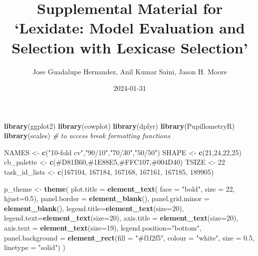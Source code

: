 \documentclass[
]{book}
\title{Supplemental Material for `Lexidate: Model Evaluation and Selection with Lexicase Selection'}
\author{Jose Guadalupe Hernandez, Anil Kumar Saini, Jason H. Moore}
\date{2024-01-31}
\newenvironment{Shaded}{\begin{snugshade}}{\end{snugshade}}
\newcommand{\AttributeTok}[1]{\textcolor[rgb]{0.13,0.29,0.53}{#1}}
\newcommand{\CommentTok}[1]{\textcolor[rgb]{0.56,0.35,0.01}{\textit{#1}}}
\newcommand{\DecValTok}[1]{\textcolor[rgb]{0.00,0.00,0.81}{#1}}
\newcommand{\FloatTok}[1]{\textcolor[rgb]{0.00,0.00,0.81}{#1}}
\newcommand{\FunctionTok}[1]{\textcolor[rgb]{0.13,0.29,0.53}{\textbf{#1}}}
\newcommand{\NormalTok}[1]{#1}
\newcommand{\OtherTok}[1]{\textcolor[rgb]{0.56,0.35,0.01}{#1}}
\newcommand{\StringTok}[1]{\textcolor[rgb]{0.31,0.60,0.02}{#1}}
\begin{document}
\maketitle

{
\setcounter{tocdepth}{1}
\tableofcontents
}
\begin{Shaded}
\begin{Highlighting}[]
\FunctionTok{library}\NormalTok{(ggplot2)}
\FunctionTok{library}\NormalTok{(cowplot)}
\FunctionTok{library}\NormalTok{(dplyr)}
\FunctionTok{library}\NormalTok{(PupillometryR)}
\FunctionTok{library}\NormalTok{(scales) }\CommentTok{\# to access break formatting functions}


\NormalTok{NAMES }\OtherTok{\textless{}{-}} \FunctionTok{c}\NormalTok{(}\StringTok{"10{-}fold cv"}\NormalTok{,}\StringTok{"90/10"}\NormalTok{,}\StringTok{"70/30"}\NormalTok{,}\StringTok{"50/50"}\NormalTok{)}
\NormalTok{SHAPE }\OtherTok{\textless{}{-}} \FunctionTok{c}\NormalTok{(}\DecValTok{21}\NormalTok{,}\DecValTok{24}\NormalTok{,}\DecValTok{22}\NormalTok{,}\DecValTok{25}\NormalTok{)}
\NormalTok{cb\_palette }\OtherTok{\textless{}{-}} \FunctionTok{c}\NormalTok{(}\StringTok{\textquotesingle{}\#D81B60\textquotesingle{}}\NormalTok{,}\StringTok{\textquotesingle{}\#1E88E5\textquotesingle{}}\NormalTok{,}\StringTok{\textquotesingle{}\#FFC107\textquotesingle{}}\NormalTok{,}\StringTok{\textquotesingle{}\#004D40\textquotesingle{}}\NormalTok{)}
\NormalTok{TSIZE }\OtherTok{\textless{}{-}} \DecValTok{22}
\NormalTok{task\_id\_lists }\OtherTok{\textless{}{-}} \FunctionTok{c}\NormalTok{(}\DecValTok{167104}\NormalTok{, }\DecValTok{167184}\NormalTok{, }\DecValTok{167168}\NormalTok{, }\DecValTok{167161}\NormalTok{, }\DecValTok{167185}\NormalTok{, }\DecValTok{189905}\NormalTok{)}

\NormalTok{p\_theme }\OtherTok{\textless{}{-}} \FunctionTok{theme}\NormalTok{(}
  \AttributeTok{plot.title =} \FunctionTok{element\_text}\NormalTok{( }\AttributeTok{face =} \StringTok{"bold"}\NormalTok{, }\AttributeTok{size =} \DecValTok{22}\NormalTok{, }\AttributeTok{hjust=}\FloatTok{0.5}\NormalTok{),}
  \AttributeTok{panel.border =} \FunctionTok{element\_blank}\NormalTok{(),}
  \AttributeTok{panel.grid.minor =} \FunctionTok{element\_blank}\NormalTok{(),}
  \AttributeTok{legend.title=}\FunctionTok{element\_text}\NormalTok{(}\AttributeTok{size=}\DecValTok{20}\NormalTok{),}
  \AttributeTok{legend.text=}\FunctionTok{element\_text}\NormalTok{(}\AttributeTok{size=}\DecValTok{20}\NormalTok{),}
  \AttributeTok{axis.title =} \FunctionTok{element\_text}\NormalTok{(}\AttributeTok{size=}\DecValTok{20}\NormalTok{),}
  \AttributeTok{axis.text =} \FunctionTok{element\_text}\NormalTok{(}\AttributeTok{size=}\DecValTok{19}\NormalTok{),}
  \AttributeTok{legend.position=}\StringTok{"bottom"}\NormalTok{,}
  \AttributeTok{panel.background =} \FunctionTok{element\_rect}\NormalTok{(}\AttributeTok{fill =} \StringTok{"\#f1f2f5"}\NormalTok{,}
                                  \AttributeTok{colour =} \StringTok{"white"}\NormalTok{,}
                                  \AttributeTok{size =} \FloatTok{0.5}\NormalTok{, }\AttributeTok{linetype =} \StringTok{"solid"}\NormalTok{)}
\NormalTok{)}
\end{Highlighting}
\end{Shaded}
\end{document}
